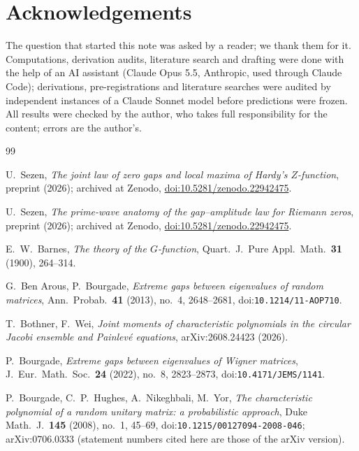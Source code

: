 \documentclass[12pt]{amsart}
\theoremstyle{remark}
\newcommand{\1}{\mathbf{1}}
\begin{document}
\section*{Acknowledgements}

The question that started this note was asked by a reader; we thank them
for it. Computations, derivation audits, literature search and drafting
were done with the help of an AI assistant (Claude Opus 5.5, Anthropic,
used through Claude Code); derivations, pre-registrations and literature
searches were audited by independent instances of a Claude Sonnet model
before predictions were frozen. All results were checked by the author,
who takes full responsibility for the content; errors are the author's.

\begin{thebibliography}{99}

 U.~Sezen, \emph{The joint law of zero gaps and local
maxima of Hardy's $Z$-function}, preprint (2026); archived at Zenodo,
\href{https://doi.org/10.5281/zenodo.22942475}{doi:10.5281/zenodo.22942475}.

 U.~Sezen, \emph{The prime-wave anatomy of the
gap--amplitude law for Riemann zeros}, preprint (2026); archived at Zenodo,
\href{https://doi.org/10.5281/zenodo.22942475}{doi:10.5281/zenodo.22942475}.

 E.~W.~Barnes, \emph{The theory of the $G$-function},
Quart.\ J.\ Pure Appl.\ Math.\ \textbf{31} (1900), 264--314.

 G.~Ben Arous, P.~Bourgade, \emph{Extreme gaps between
eigenvalues of random matrices}, Ann.\ Probab.\ \textbf{41} (2013), no.~4,
2648--2681, doi:\nolinkurl{10.1214/11-AOP710}.

 T.~Bothner, F.~Wei, \emph{Joint moments of characteristic
polynomials in the circular Jacobi ensemble and Painlev\'e equations},
arXiv:2608.24423 (2026).

 P.~Bourgade, \emph{Extreme gaps between eigenvalues of
Wigner matrices}, J.\ Eur.\ Math.\ Soc.\ \textbf{24} (2022), no.~8,
2823--2873, doi:\nolinkurl{10.4171/JEMS/1141}.

 P.~Bourgade, C.~P.~Hughes, A.~Nikeghbali, M.~Yor,
\emph{The characteristic polynomial of a random unitary matrix: a
probabilistic approach}, Duke Math.\ J.\ \textbf{145} (2008), no.~1,
45--69, doi:\nolinkurl{10.1215/00127094-2008-046}; arXiv:0706.0333 (statement numbers
cited here are those of the arXiv version).


\end{thebibliography}
\end{document}
